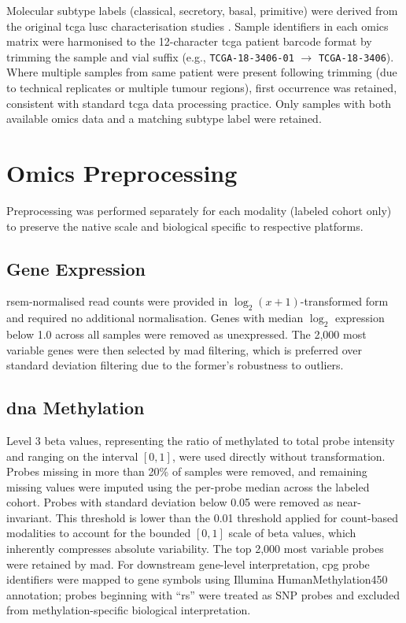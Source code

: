 Molecular subtype labels (classical, secretory, basal, primitive) were derived from the original \gls{tcga} \gls{lusc} characterisation studies \parencite{Wilkerson2010, Hammerman2012}. Sample identifiers in each omics matrix were harmonised to the 12-character \gls{tcga} patient barcode format by trimming the sample and vial suffix (e.g., \texttt{TCGA-18-3406-01} $\to$ \texttt{TCGA-18-3406}). Where multiple samples from same patient were present following trimming (due to technical replicates or multiple tumour regions), first occurrence was retained, consistent with standard \gls{tcga} data processing practice. Only samples with both available omics data and a matching subtype label were retained.

\section{Omics Preprocessing}
\label{sec:omics_preprocessing_method}

Preprocessing was performed separately for each modality (labeled cohort only) to preserve the native scale and biological specific to respective platforms.

\subsection{Gene Expression}
\gls{rsem}-normalised read counts were provided in $\log_2(x+1)$-transformed form and required no additional normalisation. Genes with median $\log_2$ expression below 1.0 across all samples were removed as unexpressed. The 2,000 most variable genes were then selected by \gls{mad} filtering, which is preferred over standard deviation filtering due to the former's robustness to outliers.

\subsection{\gls{dna} Methylation}
Level 3 beta values, representing the ratio of methylated to total probe intensity and ranging on the interval $[0,1]$, were used directly without transformation. Probes missing in more than 20\% of samples were removed, and remaining missing values were imputed using the per-probe median across the labeled cohort. Probes with standard deviation below 0.05 were removed as near-invariant. This threshold is lower than the 0.01 threshold applied for count-based modalities to account for the bounded $[0, 1]$ scale of beta values, which inherently compresses absolute variability. The top 2,000 most variable probes were retained by \gls{mad}. For downstream gene-level interpretation, \gls{cpg} probe identifiers were mapped to gene symbols using Illumina HumanMethylation450 annotation; probes beginning with ``rs'' were treated as SNP probes and excluded from methylation-specific biological interpretation.

